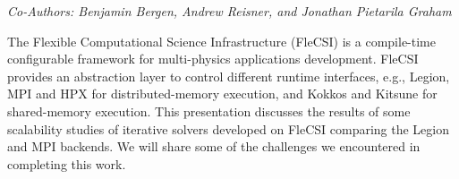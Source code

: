 \begin{center}
\textit{Co-Authors: Benjamin	Bergen, Andrew	Reisner, and Jonathan Pietarila Graham}
\end{center} 
The Flexible Computational Science Infrastructure (FleCSI) is a compile-time configurable framework for multi-physics applications development. FleCSI provides an abstraction layer to control different runtime interfaces, e.g., Legion, MPI and HPX for distributed-memory execution, and Kokkos and Kitsune for shared-memory execution. This presentation discusses the results of some scalability studies of iterative solvers developed on FleCSI comparing the Legion and MPI backends. We will share some of the challenges we encountered in completing this work.